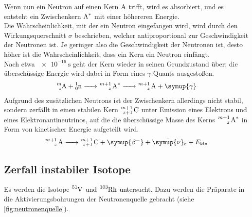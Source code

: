     Wenn nun ein Neutron auf einen Kern $\ce{A}$ trifft,
    wird es absorbiert, und es entsteht ein Zwischenkern $\ce{A^*}$ mit einer höhereren Energie. \\
    Die Wahrscheinlichkeit, mit der ein Neutron eingefangen wird,
    wird durch den Wirkungsquerschnitt $\sigma$ beschrieben,
    welcher antiproportional zur Geschwindigkeit der Neutronen ist.
    Je geringer also die Geschwindigkeit der Neutronen ist,
    desto höher ist die Wahrscheinlichkeit,
    dass ein Kern ein Neutron einfängt. \\
    Nach etwa $\SI{e-16}{\second}$ geht der Kern wieder in seinen Grundzustand über;
    die überschüssige Energie wird dabei in Form eines $\gamma$-Quants ausgestoßen.
    \begin{equation*}
        \ce{^{m}_{z}A + ^{1}_{0}n -> ^{m+1}_{z} A^* -> ^{m+1}_{z} A + \symup{\gamma}}
    \end{equation*}
    Aufgrund des zusätzlichen Neutrons ist der Zwischenkern allerdings nicht stabil,
    sondern zerfällt in einen stabilen Kern $\ce{^{m+1}_{z+1} C}$ unter Emission eines Elektrons und eines Elektronantineutrinos,
    auf die die überschüssige Masse des Kerns $\ce{^{m+1}_{z} A^*}$ in Form von kinetischer Energie aufgeteilt wird.
    \begin{equation*}
        \ce{^{m+1}_{z} A -> ^{m+1}_{z+1} C + \symup{\beta^{-}} + \bar{\symup{\nu}}_e} + E_\text{kin}
    \end{equation*}

\subsection{Zerfall instabiler Isotope}
\label{sec:theorie:zerfall_instabiler_isotope}

    Es werden die Isotope $\ce{^{51}V}$ und $\ce{^{103}Rh}$ untersucht.
    Dazu werden die Präparate in die Aktivierungsbohrungen der Neutronenquelle gebracht
    (siehe \autoref{fig:neutronenquelle}). \\

